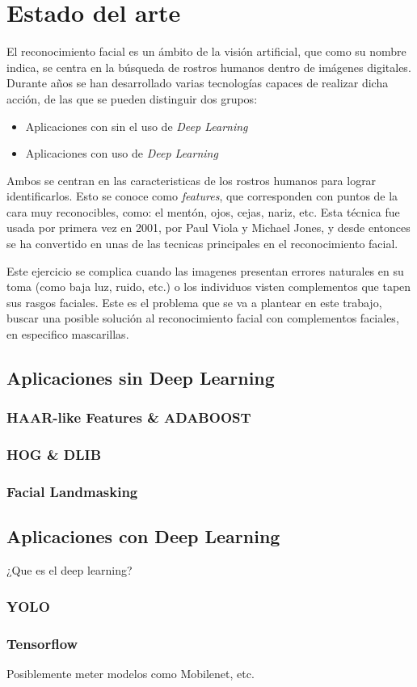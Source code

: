 
\chapter{Estado del arte}

El reconocimiento facial es un ámbito de la visión artificial, que como su nombre indica, se centra en la búsqueda de rostros humanos dentro de imágenes digitales. Durante años se han desarrollado varias tecnologías capaces de realizar dicha acción, de las que se pueden distinguir dos grupos:

\begin{itemize}
	\item Aplicaciones con sin el uso de \textit{Deep Learning}
	\item Aplicaciones con uso de \textit{Deep Learning}
\end{itemize}

Ambos se centran en las caracteristicas de los rostros humanos para lograr identificarlos. Esto se conoce como \textit{features}, que corresponden con puntos de la cara muy reconocibles, como: el mentón, ojos, cejas, nariz, etc. Esta técnica fue usada por primera vez en 2001, por Paul Viola y Michael Jones, y desde entonces se ha convertido en unas de las tecnicas principales en el reconocimiento facial.

Este ejercicio se complica cuando las imagenes presentan errores naturales en su toma (como baja luz, ruido, etc.) o los individuos visten complementos que tapen sus rasgos faciales. Este es el problema que se va a plantear en este trabajo, buscar una posible solución al reconocimiento facial con complementos faciales, en especifico mascarillas.

\section{Aplicaciones sin Deep Learning}

\subsection{HAAR-like Features \& ADABOOST}

\subsection{HOG \& DLIB}

\subsection{Facial Landmasking}


\section{Aplicaciones con Deep Learning}

¿Que es el deep learning?

\subsection{YOLO}

\subsection{Tensorflow}

Posiblemente meter modelos como Mobilenet, etc.

